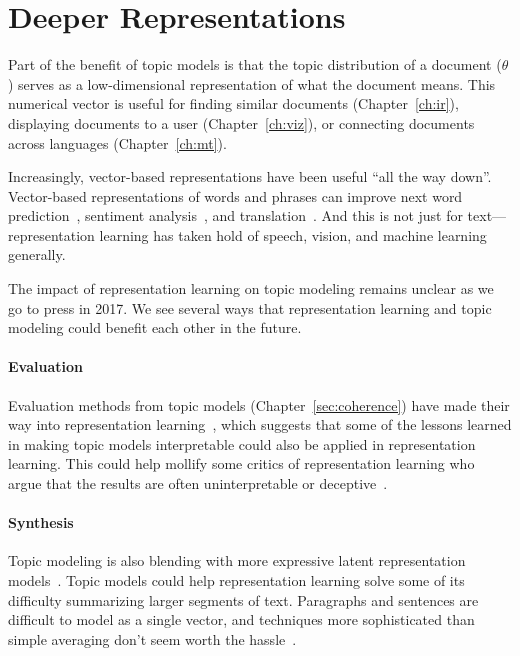 \section{Deeper Representations}

Part of the benefit of topic models is that the topic distribution of
a document ($\theta$) serves as a low-dimensional representation of
what the document means.  This numerical vector is useful for finding
similar documents (Chapter~\ref{ch:ir}), displaying documents to a user
(Chapter~\ref{ch:viz}), or connecting documents across languages
(Chapter~\ref{ch:mt}).

Increasingly, vector-based representations have been useful ``all the
way down''.  Vector-based representations of words and phrases can
improve next word prediction~\citep{bengio-03}, sentiment
analysis~\citep{socher-12}, and translation~\citep{devlin-14}.  And
this is not just for text---representation learning has taken hold of
speech, vision, and machine learning generally.

The impact of representation learning on topic modeling remains
unclear as we go to press in 2017.  We see several ways that
representation learning and topic modeling could benefit each other in
the future.

\paragraph{Evaluation}

Evaluation methods from topic models (Chapter~\ref{sec:coherence})
have made their way into representation
learning~\cite{schnabel-15,iyyer-16}, which suggests that some of the
lessons learned in making topic models interpretable could also be
applied in representation learning.  This could help mollify some
critics of representation learning who argue that the results are
often uninterpretable or deceptive~\citep{szegedy-13}.

\paragraph{Synthesis}

Topic modeling is also blending with more expressive latent
representation models~\citep{ranganath-15}.  Topic models could help
representation learning solve some of its difficulty summarizing
larger segments of text.  Paragraphs and sentences are difficult to
model as a single vector, and techniques more sophisticated than
simple averaging don't seem worth the hassle~\citep{iyyer-15}.

